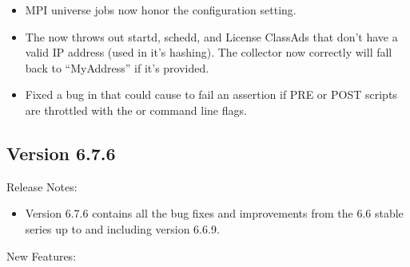 \begin{itemize}
\item MPI universe jobs now honor the 
configuration setting.

\item The  now throws out startd, schedd, and License
ClassAds that don't have a valid IP address (used in it's hashing).  The
collector now correctly will fall back to ``MyAddress'' if it's provided.

\item Fixed a bug in  that could cause 
to fail an assertion if PRE or POST scripts are throttled with the
 or   command line flags.

\end{itemize}


\subsection{\label{sec:New-6-7-6}Version 6.7.6}

\noindent Release Notes:

\begin{itemize}

\item Version 6.7.6 contains all the bug fixes and improvements from
  the 6.6 stable series up to and including version 6.6.9.

\end{itemize}

\noindent New Features:

